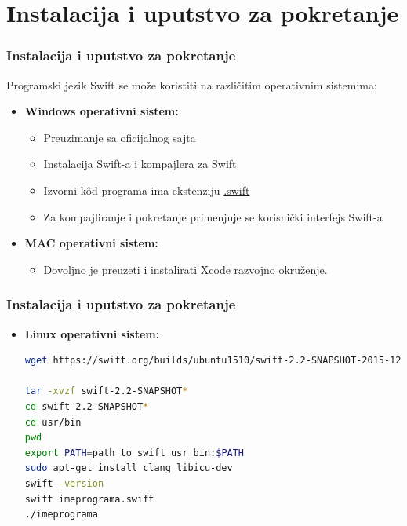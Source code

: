 \documentclass{beamer}
\begin{document}
\section{Instalacija i uputstvo za pokretanje}
\begin{frame}
\frametitle{Instalacija i uputstvo za pokretanje}

Programski jezik Swift se može koristiti na različitim operativnim sistemima:\\

\begin{itemize}

\item{\textbf{Windows operativni sistem:}}
\begin{itemize}
\item{Preuzimanje sa oficijalnog sajta}
\item{Instalacija Swift-a i kompajlera za Swift.}
\item{Izvorni k\^{o}d programa ima ekstenziju \underline{.swift}}
\item{Za kompajliranje i pokretanje primenjuje se korisnički interfejs Swift-a}
\end{itemize}

\item{\textbf{MAC operativni sistem:}}
\begin{itemize}
\item{Dovoljno je preuzeti i instalirati Xcode razvojno okruženje.}
\end{itemize}

\end{itemize}

\end{frame}

\begin{frame}[fragile]
\frametitle{Instalacija i uputstvo za pokretanje}

\begin{itemize}

\item \textbf{Linux operativni sistem:}
\begin{lstlisting}[language=bash, caption={Instaliranje Swift-a}]
wget https://swift.org/builds/ubuntu1510/swift-2.2-SNAPSHOT-2015-12-10-a/swift-2.2-SNAPSHOT-2015-12-10-a-ubuntu15.10.tar.gz
	
tar -xvzf swift-2.2-SNAPSHOT*
cd swift-2.2-SNAPSHOT*
cd usr/bin
pwd
export PATH=path_to_swift_usr_bin:$PATH
sudo apt-get install clang libicu-dev
swift -version
swift imeprograma.swift
./imeprograma
\end{lstlisting}


		 
\end{itemize}

\end{frame}
\end{document}
